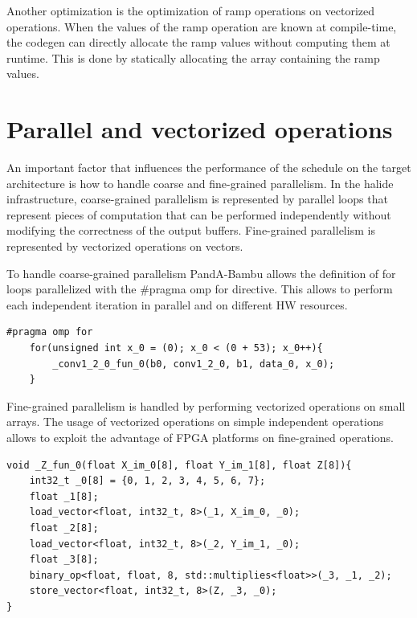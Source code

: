 \documentclass[../main.tex]{subfiles}
\begin{document}
Another optimization is the optimization of ramp operations on vectorized operations.
When the values of the ramp operation are known at compile-time, the codegen can directly allocate the ramp values without computing them at runtime.
This is done by statically allocating the array containing the ramp values.

\section{Parallel and vectorized operations}
An important factor that influences the performance of the schedule on the target architecture is how to handle coarse and fine-grained parallelism.
In the halide infrastructure, coarse-grained parallelism is represented by parallel loops that represent pieces of computation that can be performed independently without modifying the correctness of the output buffers.
Fine-grained parallelism is represented by vectorized operations on vectors.

To handle coarse-grained parallelism PandA-Bambu allows the definition of for loops parallelized with the \#pragma omp for directive. This allows to perform each independent iteration in parallel and on different HW resources.

\bigskip
\begin{lstlisting}[caption = Example of coarse-grained parallelism exploited by parallelizing independent iterations. The final model will perform each iteration of the for loop on different resources.]
    #pragma omp for
    for(unsigned int x_0 = (0); x_0 < (0 + 53); x_0++){
        _conv1_2_0_fun_0(b0, conv1_2_0, b1, data_0, x_0);
    }
\end{lstlisting}

\bigskip
Fine-grained parallelism is handled by performing vectorized operations on small arrays. The usage of vectorized operations on simple independent operations allows to exploit the advantage of FPGA platforms on fine-grained operations.

\bigskip
\begin{lstlisting}[caption = Example of vector multiplication exploiting vectorized operations. In this example the multiply operation is performed on small arrays representing vectors of 8 elements.]
void _Z_fun_0(float X_im_0[8], float Y_im_1[8], float Z[8]){
    int32_t _0[8] = {0, 1, 2, 3, 4, 5, 6, 7};
    float _1[8];
    load_vector<float, int32_t, 8>(_1, X_im_0, _0);
    float _2[8];
    load_vector<float, int32_t, 8>(_2, Y_im_1, _0);
    float _3[8];
    binary_op<float, float, 8, std::multiplies<float>>(_3, _1, _2);
    store_vector<float, int32_t, 8>(Z, _3, _0);
}
\end{lstlisting}
\end{document}
